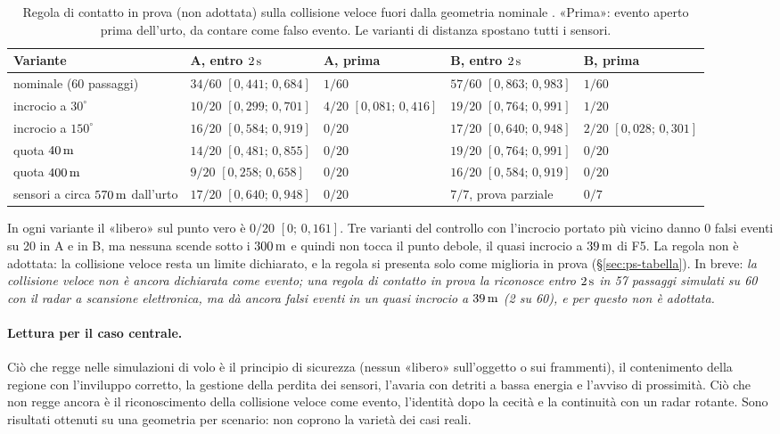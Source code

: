 \begin{table}[H]\centering\footnotesize
\caption{Regola di contatto in prova (non adottata) sulla collisione veloce fuori dalla geometria nominale . «Prima»: evento aperto prima dell'urto, da contare come falso evento. Le varianti di distanza spostano tutti i sensori.}\label{tab:vo-contatto}
\begin{tabularx}{\linewidth}{@{}>{\RaggedRight\arraybackslash}p{3.6cm}LLLL@{}}
\toprule
Variante & A, entro $2\,\mathrm{s}$ & A, prima & B, entro $2\,\mathrm{s}$ & B, prima\\
\midrule
nominale (60 passaggi) & $34/60$ $[0{,}441;\,0{,}684]$ & $1/60$ & $57/60$ $[0{,}863;\,0{,}983]$ & $1/60$\\
incrocio a $30^\circ$ & $10/20$ $[0{,}299;\,0{,}701]$ & $4/20$ $[0{,}081;\,0{,}416]$ & $19/20$ $[0{,}764;\,0{,}991]$ & $1/20$\\
incrocio a $150^\circ$ & $16/20$ $[0{,}584;\,0{,}919]$ & $0/20$ & $17/20$ $[0{,}640;\,0{,}948]$ & $2/20$ $[0{,}028;\,0{,}301]$\\
quota $40\,\mathrm{m}$ & $14/20$ $[0{,}481;\,0{,}855]$ & $0/20$ & $19/20$ $[0{,}764;\,0{,}991]$ & $0/20$\\
quota $400\,\mathrm{m}$ & $9/20$ $[0{,}258;\,0{,}658]$ & $0/20$ & $16/20$ $[0{,}584;\,0{,}919]$ & $0/20$\\
sensori a circa $570\,\mathrm{m}$ dall'urto & $17/20$ $[0{,}640;\,0{,}948]$ & $0/20$ & $7/7$, prova parziale & $0/7$\\
\bottomrule
\end{tabularx}
\end{table}
In ogni variante il «libero» sul punto vero è $0/20$ $[0;\,0{,}161]$. Tre varianti del controllo con l'incrocio portato più vicino danno 0 falsi eventi su 20 in A e in B, ma nessuna scende sotto i $300\,\mathrm{m}$ e quindi non tocca il punto debole, il quasi incrocio a $39\,\mathrm{m}$ di F5. La regola non è adottata: la collisione veloce resta un limite dichiarato, e la regola si presenta solo come miglioria in prova (\S\ref{sec:ps-tabella}). In breve: \emph{la collisione veloce non è ancora dichiarata come evento; una regola di contatto in prova la riconosce entro $2\,\mathrm{s}$ in 57 passaggi simulati su 60 con il radar a scansione elettronica, ma dà ancora falsi eventi in un quasi incrocio a $39\,\mathrm{m}$ (2 su 60), e per questo non è adottata.}

\paragraph{Lettura per il caso centrale.} Ciò che regge nelle simulazioni di volo è il principio di sicurezza (nessun «libero» sull'oggetto o sui frammenti), il contenimento della regione con l'inviluppo corretto, la gestione della perdita dei sensori, l'avaria con detriti a bassa energia e l'avviso di prossimità. Ciò che non regge ancora è il riconoscimento della collisione veloce come evento, l'identità dopo la cecità e la continuità con un radar rotante. Sono risultati ottenuti su una geometria per scenario: non coprono la varietà dei casi reali.

